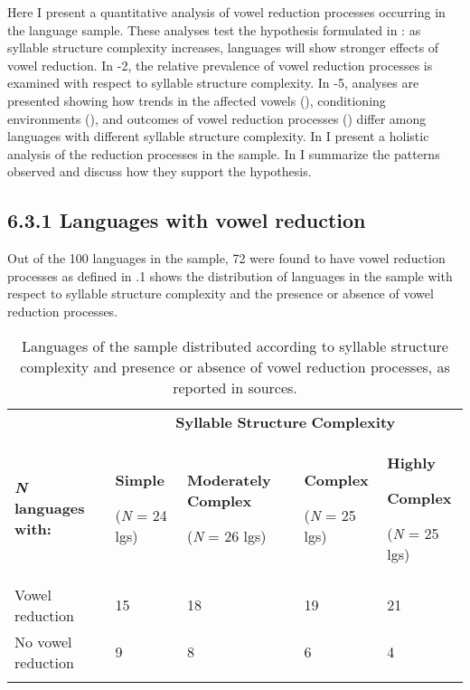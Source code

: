   Here I present a quantitative analysis of vowel reduction processes occurring in the language sample. These analyses test the hypothesis formulated in : as syllable structure complexity increases, languages will show stronger effects of vowel reduction. In -2, the relative prevalence of vowel reduction processes is examined with respect to syllable structure complexity. In -5, analyses are presented showing how trends in the affected vowels (), conditioning environments (), and outcomes of vowel reduction processes () differ among languages with different syllable structure complexity. In  I present a holistic analysis of the reduction processes in the sample. In  I summarize the patterns observed and discuss how they support the hypothesis.


\subsection{6.3.1 Languages with vowel reduction}

  Out of the 100 languages in the sample, 72 were found to have vowel reduction processes as defined in  .1 shows the distribution of languages in the sample with respect to syllable structure complexity and the presence or absence of vowel reduction processes.






\begin{table}
\begin{tabularx}{\textwidth}{XXXXX}
\lsptoprule
 & \multicolumn{4}{c}{ \textbf{Syllable} \textbf{Structure} \textbf{Complexity}}\\
 \textbf{\textit{N}} \textbf{languages} \textbf{with:} & { \textbf{Simple}}

 (\textit{N} = 24 lgs) & { \textbf{Moderately} \textbf{Complex}}

 (\textit{N} = 26 lgs) & { \textbf{Complex}}

 (\textit{N} = 25 lgs) & { \textbf{Highly} }

{ \textbf{Complex}}

 (\textit{N} = 25 lgs)\\
 Vowel reduction & 15 & 18 & 19 & 21\\
 No vowel reduction & 9 & 8 & 6 & 4\\
\lspbottomrule
\end{tabularx}
\caption{\label{6.1}Languages of the sample distributed according to syllable structure complexity and presence or absence of vowel reduction processes, as reported in sources.}
\end{table}




